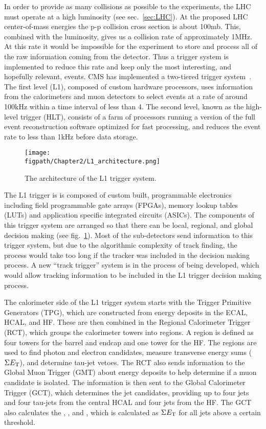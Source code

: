 In order to provide as many collisions as possible to the experiments, the LHC must operate at a high luminosity (see sec.~\ref{sec:LHC}).
At the proposed LHC center-of-mass energies the p-p collision cross section is about 100\unit{mb}.
This, combined with the luminosity, gives us a collision rate of approximately 1\unit{MHz}.
At this rate it would be impossible for the experiment to store and process all of the raw information coming from the detector.
Thus a trigger system is implemented to reduce this rate and keep only the most interesting, and hopefully relevant, events.
CMS has implemented a two-tiered trigger system~\cite{Khachatryan:2016bia}.
The first level (L1), composed of custom hardware processors, uses information from the calorimeters and muon detectors to select events at a rate of around 100\unit{kHz} within a time interval of less than 4\mus.
The second level, known as the high-level trigger (HLT), consists of a farm of processors running a version of the full event reconstruction software optimized for fast processing, and reduces the event rate to less than 1\unit{kHz} before data storage.

\begin{figure}[!hbt]
	\centering
	\texttt{[image: \\figpath/Chapter2/L1\_architecture.png]}
	\caption{The architecture of the L1 trigger system.}
	\label{fig:CMS_L1_architecture}
\end{figure}

The L1 trigger is is composed of custom built, programmable electronics including field programmable gate arrays (FPGAs), memory lookup tables (LUTs) and application specific integrated circuits (ASICs).
The components of this trigger system are arranged so that there can be local, regional, and global decision making (see fig.~\ref{fig:CMS_L1_architecture}).
Most of the sub-detectors send information to this trigger system, but due to the algorithmic complexity of track finding, the process would take too long if the tracker was included in the decision making process.
A new ``track trigger'' system is in the process of being developed, which would allow tracking information to be included in the L1 trigger decision making process.

The calorimeter side of the L1 trigger system starts with the Trigger Primitive Generators (TPG), which are constructed from energy deposits in the ECAL, HCAL, and HF.
These are then combined in the Regional Calorimeter Trigger (RCT), which groups the calorimeter towers into regions.
A region is defined as four towers for the barrel and endcap and one tower for the HF.
The regions are used to find photon and electron candidates, measure transverse energy sums ($\Sigma E_{\mathrm{T}}$), and determine tau-jet vetoes.
The RCT also sends information to the Global Muon Trigger (GMT) about energy deposits to help determine if a muon candidate is isolated.
The information is then sent to the Global Calorimeter Trigger (GCT), which determines the jet candidates, providing up to four jets and four tau-jets from the central HCAL and four jets from the HF.
The GCT also calculates the \ET, \ETslash, and \HT, which is calculated as $\Sigma E_{\mathrm{T}}$ for all jets above a certain threshold.

